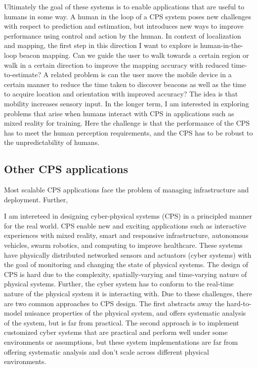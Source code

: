 \documentclass[10pt]{article}
\begin{document}
Ultimately the goal of these systems is to enable applications that are useful to humans in some way.
A human in the loop of a CPS system poses new challenges with respect to prediction and estimation, but introduces new ways to improve performance using control and action by the human. In context of localization and mapping, the first step in this direction I want to explore is human-in-the-loop beacon mapping. Can we guide the user to walk towards a certain region or walk in a certain direction to improve the mapping accuracy with reduced time-to-estimate? A related problem is can the user move the mobile device in a certain manner to reduce the time taken to discover beacons as well as the time to acquire location and orientation with improved accuracy? The idea is that mobility increases sensory input. In the longer term, I am interested in exploring problems that arise when humans interact with CPS in applications such as mixed reality for training. Here the challenge is that the performance of the CPS has to meet the human perception requirements, and the CPS has to be robust to the unpredictability of humans. 

\subsection{Other CPS applications}
Most scalable CPS applications face the problem of managing infrastructure and deployment. Further, 






\newpage
I am intereteed in designing cyber-physical systems (CPS) in a principled manner for the real world. CPS enable new and exciting applications such as interactive experiences with mixed reality, smart and responsive infrastructure, autonomous vehicles, swarm robotics, and computing to improve healthcare. These systems have physically distributed networked sensors and actuators (cyber systems) with the goal of monitoring and changing the state of physical systems. The design of CPS is hard due to the complexity, spatially-varying and time-varying nature of physical systems. %
Further, the cyber system has to conform to the real-time nature of the physical system it is interacting with. Due to these challenges, there are two common approaches to CPS design. The first abstracts away the hard-to-model nuisance properties of the physical system, and offers systematic analysis of the system, but is far from practical. The second approach is to implement customized cyber systems that are practical and perform well under some environments or assumptions, but these system implementations are far from offering systematic analysis and don't scale across different physical environments. \\
\end{document}
